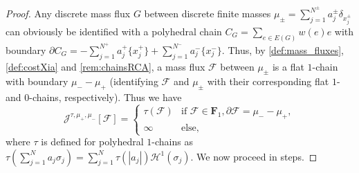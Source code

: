 \documentclass[10pt,a4paper,oneside,final]{article}
\newcommand{\R}{{\mathbb{R}}}
\newcommand{\hdone}{\mathcal{H}^1}
\newcommand{\mass}[1]{M(#1)}
\newcommand{\flatChains}[1]{\mathbf F_{#1}}
\newcommand{\flux}{{\mathcal{F}}}
\newcommand{\JEn}{{\mathcal{J}}}
\newcommand{\transportPath}{mass flux}
\numberwithin{equation}{section}
\theoremstyle{plain}
\theoremstyle{definition}
\theoremstyle{remark}
\begin{document}
\begin{proof}
Any discrete \transportPath{} $G$ between discrete finite masses $\mu_\pm=\sum_{j=1}^{N^\pm}a_j^\pm\delta_{x_j^\pm}$ can obviously be identified
with a polyhedral chain $C_G=\sum_{e\in E(G)}w(e)e$ with boundary $\partial C_G=-\sum_{j=1}^{N^+}a_j^+\{x_j^+\}+\sum_{j=1}^{N^-}a_j^-\{x_j^-\}$.
Thus, by \cref{def:mass_fluxes}, \cref{def:costXia} and \cref{rem:chainsRCA}, a \transportPath{} $\flux$ between $\mu_\pm$ is a flat $1$-chain with boundary $\mu_--\mu_+$
(identifying $\flux$ and $\mu_\pm$ with their corresponding flat $1$- and $0$-chains, respectively).
Thus we have
\begin{equation*}
\JEn^{\tau,\mu_+,\mu_-}[\flux]=\begin{cases}\tau(\flux)&\text{if }\flux\in\flatChains1,\partial\flux=\mu_--\mu_+,\\\infty&\text{else,}\end{cases}
\end{equation*}
where $\tau$ is defined for polyhedral $1$-chains as $\tau(\sum_{j=1}^Na_j\sigma_j)=\sum_{j=1}^N\tau(|a_j|)\hdone(\sigma_j)$.
We now proceed in steps.
% 
% 
% 
% 
% 
% 


\end{proof}
\end{document}
